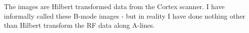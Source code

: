 The images are Hilbert transformed data from the Cortex scanner.
I have informally called these B-mode images - but in reality I have done nothing other than  Hilbert transform the RF data along A-lines.










